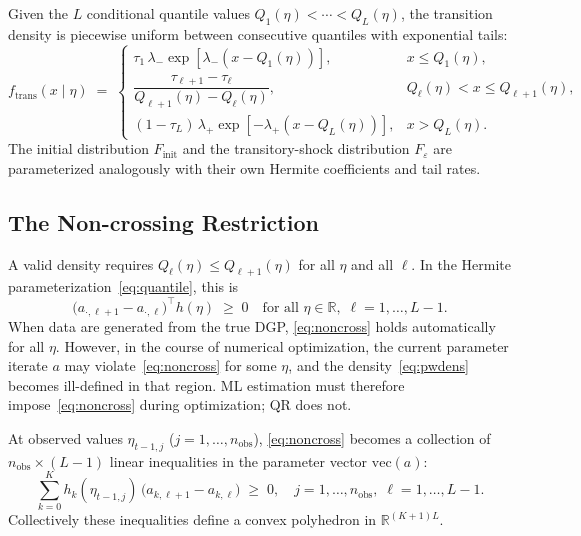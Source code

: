 \documentclass[12pt]{article}
\begin{document}
Given the $L$ conditional quantile values $Q_{1}(\eta) < \cdots < Q_{L}(\eta)$, the transition density is piecewise uniform between consecutive quantiles with exponential tails:
\begin{equation}
f_{\mathrm{trans}}(x \mid \eta) \;=\;
\begin{cases}
\tau_{1}\,\lambda_{-} \exp\!\left[\lambda_{-}(x - Q_{1}(\eta))\right], & x \leq Q_{1}(\eta),\\[4pt]
\dfrac{\tau_{\ell+1} - \tau_{\ell}}{Q_{\ell+1}(\eta) - Q_{\ell}(\eta)}, & Q_{\ell}(\eta) < x \leq Q_{\ell+1}(\eta),\\[8pt]
(1 - \tau_{L})\,\lambda_{+} \exp\!\left[-\lambda_{+}(x - Q_{L}(\eta))\right], & x > Q_{L}(\eta).
\end{cases}
\label{eq:pwdens}
\end{equation}
The initial distribution $F_{\mathrm{init}}$ and the transitory-shock distribution $F_{\varepsilon}$ are parameterized analogously with their own Hermite coefficients and tail rates.

\subsection{The Non-crossing Restriction}

A valid density requires $Q_{\ell}(\eta) \leq Q_{\ell+1}(\eta)$ for all $\eta$ and all $\ell$. In the Hermite parameterization~\eqref{eq:quantile}, this is
\begin{equation}
\bigl(a_{\cdot,\ell+1} - a_{\cdot,\ell}\bigr)^{\top} h(\eta) \;\geq\; 0
\quad \text{for all } \eta \in \mathbb{R},\; \ell = 1,\dots,L-1.
\label{eq:noncross}
\end{equation}
When data are generated from the true DGP, \eqref{eq:noncross} holds automatically for all $\eta$. However, in the course of numerical optimization, the current parameter iterate $a$ may violate~\eqref{eq:noncross} for some $\eta$, and the density~\eqref{eq:pwdens} becomes ill-defined in that region. ML estimation must therefore impose~\eqref{eq:noncross} during optimization; QR does not.

At observed values $\eta_{t-1,j}$ ($j = 1, \dots, n_{\mathrm{obs}}$), \eqref{eq:noncross} becomes a collection of $n_{\mathrm{obs}} \times (L-1)$ linear inequalities in the parameter vector $\mathrm{vec}(a)$:
\[
\sum_{k=0}^{K} h_{k}(\eta_{t-1,j})\,\bigl(a_{k,\ell+1} - a_{k,\ell}\bigr) \;\geq\; 0,
\quad j = 1,\dots,n_{\mathrm{obs}},\; \ell = 1,\dots,L-1.
\]
Collectively these inequalities define a convex polyhedron in $\mathbb{R}^{(K+1)L}$.
\end{document}
